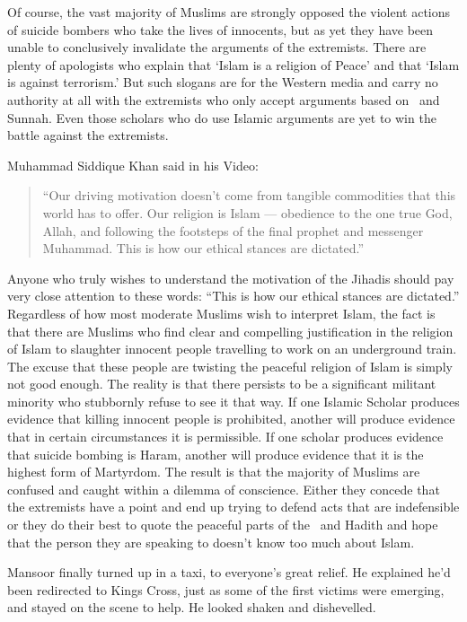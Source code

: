 \documentclass[12pt]{memoir}
\begin{document}
Of course, the vast majority of Muslims are strongly opposed 
the violent actions of suicide bombers
who take the lives of innocents,
but as yet they have been unable to conclusively invalidate
the arguments of the extremists.
There are plenty of apologists who explain that ‘Islam is a religion of Peace’
and that ‘Islam is against terrorism.’
But such slogans are for the Western media and carry no authority at all
with the extremists who only accept arguments based on \Quran\ and Sunnah.
Even those  scholars who do use Islamic arguments
are yet to win the battle against the extremists.

Muhammad Siddique Khan said in his  Video:

\begin{quote}
“Our driving motivation doesn’t come from tangible commodities
that this world has to offer.
Our religion is Islam — obedience to the one true God, Allah,
and following the footsteps of the final prophet and messenger Muhammad.
This is how our ethical stances are dictated.”
\end{quote}

Anyone who truly wishes to understand the motivation of the Jihadis
should pay very close attention to these words:
“This is how our ethical stances are dictated.”
Regardless of how most moderate Muslims wish to interpret Islam,
the fact is that there are Muslims who find clear and compelling justification
in the religion of Islam to slaughter innocent people
travelling to work on an underground train.
The excuse that these people are twisting the peaceful religion of Islam
is simply not good enough.
The reality is that there persists to be a significant militant minority
who stubbornly refuse to see it that way.
If one Islamic Scholar produces evidence
that killing innocent people is prohibited,
another will produce evidence that in certain circumstances it is permissible.
If one scholar produces evidence that suicide bombing is Haram,
another will produce evidence that it is the highest form of Martyrdom.
The result is that the majority of Muslims are confused
and caught within a dilemma of conscience.
Either they concede that the extremists have a point
and end up trying to defend acts that are indefensible
or they do their best to quote the peaceful parts of the \Quran\ and Hadith
and hope that the person they are speaking to
doesn’t know too much about Islam.

Mansoor finally turned up in a taxi, to everyone’s great relief.
He explained he’d been re\cor{-}{}directed to Kings Cross,
just as some of the first victims were emerging,
and stayed on the scene to help.
He looked shaken and dishevelled.
\end{document}
